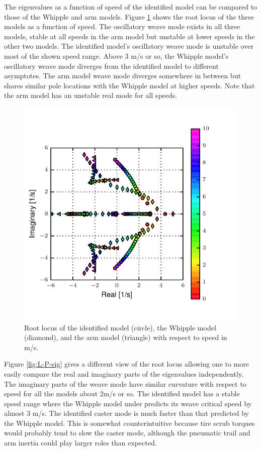 \documentclass[a4paper]{article}
\begin{document}
The eigenvalues as a function of speed of the identified model can be compared
to those of the Whipple and arm models. Figure \ref{fig:L-P-rlocus} shows the
root locus of the three models as a function of speed. The oscillatory weave
mode exists in all three models, stable at all speeds in the arm model but
unstable at lower speeds in the other two models. The identified model's
oscillatory weave mode is unstable over most of the shown speed range. Above 3
m/s or so, the Whipple model's oscillatory weave mode diverges from the
identified model to different asymptotes. The arm model weave mode diverges
somewhere in between but shares similar pole locations with the Whipple model
at higher speeds. Note that the arm model has an unstable real mode for all
speeds.

\begin{figure}
  \centering
  \includegraphics[width=5in]{figures/L-P-rlocus.pdf}
  \caption{Root locus of the identified model (circle), the Whipple model
    (diamond), and the arm model (triangle) with respect to speed in m/s.}
  \label{fig:L-P-rlocus}
\end{figure}

Figure \ref{fig:L-P-eig} gives a different view of the root locus allowing one
to more easily compare the real and imaginary parts of the eigenvalues
independently. The imaginary parts of the weave mode have similar curvature
with respect to speed for all the models about 2m/s or so. The identified model
has a stable speed range where the Whipple model under predicts its weave
critical speed by almost 3 m/s. The identified caster mode is much faster than
that predicted by the Whipple model. This is somewhat counterintuitive
because tire scrub torques would probably tend to slow the caster mode, although 
the pneumatic trail and  arm inertia could play larger
roles than expected.
\end{document}
